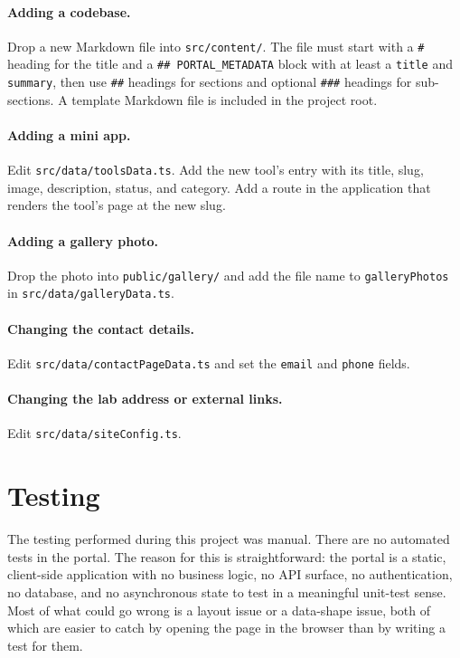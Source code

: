 \paragraph{Adding a codebase.} Drop a new Markdown file into \texttt{src/content/}. The file must start with a \texttt{\#} heading for the title and a \texttt{\#\# PORTAL\_METADATA} block with at least a \texttt{title} and \texttt{summary}, then use \texttt{\#\#} headings for sections and optional \texttt{\#\#\#} headings for sub-sections. A template Markdown file is included in the project root.

\paragraph{Adding a mini app.} Edit \texttt{src/data/toolsData.ts}. Add the new tool's entry with its title, slug, image, description, status, and category. Add a route in the application that renders the tool's page at the new slug.

\paragraph{Adding a gallery photo.} Drop the photo into \texttt{public/gallery/} and add the file name to \texttt{galleryPhotos} in \texttt{src/data/galleryData.ts}.

\paragraph{Changing the contact details.} Edit \texttt{src/data/contactPageData.ts} and set the \texttt{email} and \texttt{phone} fields.

\paragraph{Changing the lab address or external links.} Edit \texttt{src/data/siteConfig.ts}.

\section{Testing}\label{sec:dev-testing}

The testing performed during this project was manual. There are no automated tests in the portal. The reason for this is straightforward: the portal is a static, client-side application with no business logic, no API surface, no authentication, no database, and no asynchronous state to test in a meaningful unit-test sense. Most of what could go wrong is a layout issue or a data-shape issue, both of which are easier to catch by opening the page in the browser than by writing a test for them.

